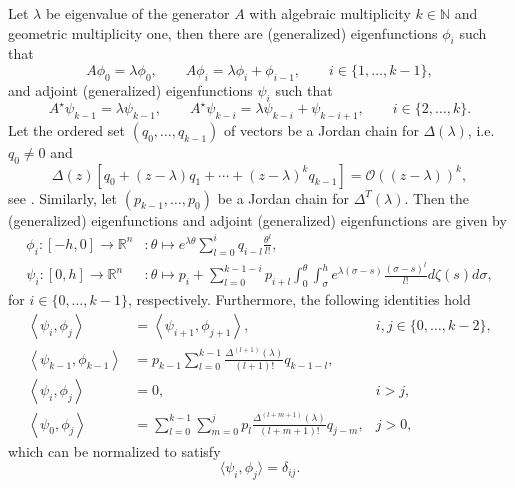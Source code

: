 \begin{proposition}
\label{btdde:proposition:eigenvalues_multiplicity_k}
Let $\lambda$ be eigenvalue of the generator $A$ with algebraic multiplicity
$k\in\mathbb N$ and geometric multiplicity one, then there are (generalized)
eigenfunctions $\phi_i$ such that
%
\begin{equation}
\label{btdde:eq:eigenspaces_eigenfunctions}
A\phi_0 = \lambda\phi_0,\qquad A\phi_i = \lambda\phi_i + \phi_{i-1}, \qquad i \in \{1,\dots,k-1\},
\end{equation}
%
and adjoint (generalized) eigenfunctions $\psi_i$ such
that
%
\begin{equation}
\label{btdde:eq:eigenspaces_ad_eigenfunctions}
A^{\star}\psi_{k-1} = \lambda\psi_{k-1}, \qquad 
    A^{\star}\psi_{k-i} = \lambda\psi_{k-i} + \psi_{k-i + 1}, \qquad i \in \{2,\dots,k\}.
\end{equation}
%
Let the ordered set $(q_0,\dots,q_{k-1})$ of vectors be a Jordan chain for $\Delta(\lambda)$, i.e.
$q_0 \neq 0$ and 
\[
    \Delta(z)[q_0 + (z-\lambda) q_1 + \cdots + (z-\lambda)^k q_{k-1}] = \mathcal O((z-\lambda))^k,
\]
see \cite[Chapter IV.4]{diekmann1995delay}.
Similarly, let $(p_{k-1},\dots,p_0)$ be a Jordan chain for $\Delta^T(\lambda)$.
Then the (generalized) eigenfunctions and adjoint (generalized) eigenfunctions are given by 
\begin{equation}
\label{btdde:eq:eigenfunction_and_adjoint_eigenfunctions}
\begin{aligned}
\phi_i \colon [-h,0] \rightarrow \mathbb R^n &\colon \theta \mapsto e^{\lambda\theta} \sum_{l=0}^i q_{i-l} \frac{\theta^l}{l!}, \\
\psi_i \colon [0,h]  \rightarrow \mathbb R^n &\colon \theta \mapsto p_i + \sum_{l=0}^{k-1-i} p_{i + l} \int_0^\theta \int_{\sigma}^h 
    e^{\lambda(\sigma-s)}\frac{(\sigma-s)^{l}}{l!} d\zeta(s) d\sigma,
\end{aligned}
\end{equation}
for $i \in \{0,\dots, k-1\}$, respectively.
Furthermore, the following identities hold
%
\begin{equation}
\label{btdde:eq:eigenfunction_identities}
\begin{aligned}
\left<\psi_i,\phi_j\right> & = \left<\psi_{i + 1},\phi_{j + 1}\right>, & i,j\in\{0,\dots,k-2\},\\
\left<\psi_{k-1},\phi_{k-1}\right> & = p_{k-1} \sum_{l=0}^{k-1} \frac{\Delta^{(l + 1)}(\lambda)}{(l + 1)!}q_{k-1-l}, \\
\left<\psi_i,\phi_j\right> & = 0, & i>j, \\
\left<\psi_0,\phi_j\right> &= \sum_{l=0}^{k-1} \sum_{m=0}^j p_l \frac{\Delta^{(l + m+1)}(\lambda)}{(l + m+1)!} q_{j-m}, 
                                 & j>0,
\end{aligned}
\end{equation}
which can be normalized to satisfy 
\begin{equation}
    \label{btdde:eq:normalization_identity}
    \langle\psi_i,\phi_j\rangle = \delta_{ij}.
\end{equation}
\end{proposition}

